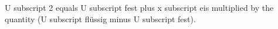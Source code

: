 U subscript 2 equals U subscript fest plus x subscript eis multiplied by the quantity (U subscript flüssig minus U subscript fest).